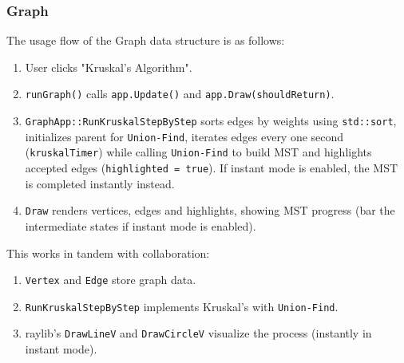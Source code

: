 \documentclass{article}
\begin{document}
\subsubsection{Graph}
The usage flow of the Graph data structure is as follows:
\begin{enumerate}
	\item User clicks "Kruskal's Algorithm".
	\item \lstinline|runGraph()| calls \lstinline|app.Update()| and \lstinline|app.Draw(shouldReturn)|.
	\item \lstinline|GraphApp::RunKruskalStepByStep| sorts edges by weights using \lstinline|std::sort|, initializes parent for \lstinline|Union-Find|, iterates edges every one second (\lstinline|kruskalTimer|) while calling \lstinline|Union-Find| to build MST and highlights accepted edges (\lstinline|highlighted = true|). If instant mode is enabled, the MST is completed instantly instead.
	\item \lstinline|Draw| renders vertices, edges and highlights, showing MST progress (bar the intermediate states if instant mode is enabled).
\end{enumerate}
This works in tandem with collaboration:
\begin{enumerate}
	\item \lstinline|Vertex| and \lstinline|Edge| store graph data.
	\item \lstinline|RunKruskalStepByStep| implements Kruskal's with \lstinline|Union-Find|.
	\item raylib's \lstinline|DrawLineV| and \lstinline|DrawCircleV| visualize the process (instantly in instant mode).
\end{enumerate}
\end{document}
